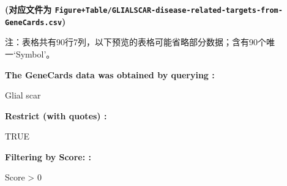 \documentclass[
]{article}
\begin{document}
\textbf{(对应文件为 \texttt{Figure+Table/GLIALSCAR-disease-related-targets-from-GeneCards.csv})}

\begin{center}\begin{tcolorbox}[colback=gray!10, colframe=gray!50, width=0.9\linewidth, arc=1mm, boxrule=0.5pt]注：表格共有90行7列，以下预览的表格可能省略部分数据；含有90个唯一`Symbol'。
\end{tcolorbox}
\end{center}\begin{center}\begin{tcolorbox}[colback=gray!10, colframe=gray!50, width=0.9\linewidth, arc=1mm, boxrule=0.5pt]
\textbf{
The GeneCards data was obtained by querying
:}

\vspace{0.5em}

    Glial scar

\vspace{2em}


\textbf{
Restrict (with quotes)
:}

\vspace{0.5em}

    TRUE

\vspace{2em}


\textbf{
Filtering by Score:
:}

\vspace{0.5em}

    Score > 0

\vspace{2em}
\end{tcolorbox}
\end{center}
\end{document}

